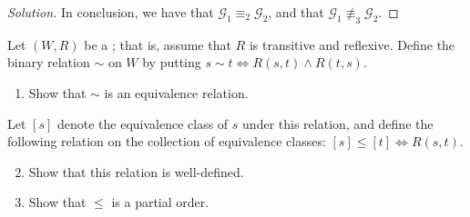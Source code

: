 \documentclass[a4paper, 12pt]{report}
\begin{document}
\begin{proof}[Solution]
        In conclusion, we have that $\mathcal G_1 \equiv_2 \mathcal G_2$, and that $\mathcal G_1 \not\equiv_3 \mathcal G_2$.
    \end{proof}

    \newpage

     Let $(W, R)$ be a ; that is, assume that $R$ is transitive and reflexive. Define the binary relation $\sim$ on $W$ by putting $s \sim t \iff R(s, t) \land R(t, s)$.

    \begin{enumerate}[label=(\alph*)]
        \item Show that $\sim$ is an equivalence relation.
    \end{enumerate}

    Let $[s]$ denote the equivalence class of $s$ under this relation, and define the following relation on the collection of equivalence classes: $[s] \le [t] \iff R(s, t)$.

    \begin{enumerate}[label=(\alph*)]
        \setcounter{enumi}{1}
        \item Show that this relation is well-defined.
        \item Show that $\le$ is a partial order.
    \end{enumerate}
\end{document}
